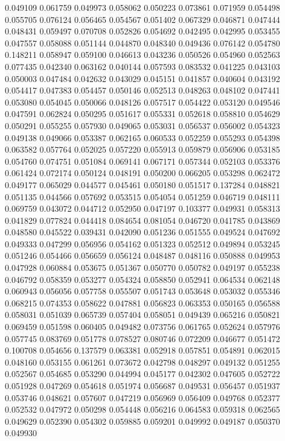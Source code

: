 0.049109
0.061759
0.049973
0.058062
0.050223
0.073861
0.071959
0.054498
0.055705
0.076124
0.056465
0.054567
0.051402
0.067329
0.046871
0.047444
0.048431
0.059497
0.070708
0.052826
0.054692
0.042495
0.042995
0.053455
0.047557
0.058088
0.051144
0.044870
0.048340
0.049436
0.076142
0.054780
0.148211
0.058947
0.059100
0.046613
0.043236
0.050526
0.054960
0.052563
0.077435
0.042340
0.063162
0.040144
0.057593
0.083532
0.041225
0.043103
0.050003
0.047484
0.042632
0.043029
0.045151
0.041857
0.040604
0.043192
0.054417
0.047383
0.054457
0.050146
0.052513
0.048263
0.048102
0.047441
0.053080
0.054045
0.050066
0.048126
0.057517
0.054422
0.053120
0.049546
0.047591
0.062824
0.050295
0.051617
0.055331
0.052618
0.058810
0.054629
0.050291
0.055255
0.057930
0.049065
0.053031
0.056537
0.056002
0.054323
0.049138
0.049066
0.053387
0.062165
0.060533
0.052259
0.055293
0.054398
0.063582
0.057764
0.052025
0.057220
0.055913
0.059879
0.056906
0.053185
0.054760
0.074751
0.051084
0.069141
0.067171
0.057344
0.052103
0.053376
0.061424
0.072174
0.050124
0.048191
0.050200
0.066205
0.053298
0.062472
0.049177
0.065029
0.044577
0.045461
0.050180
0.051517
0.137284
0.048821
0.051135
0.044566
0.057692
0.053515
0.054054
0.051259
0.046719
0.048111
0.069759
0.043072
0.044712
0.052950
0.047197
0.103377
0.049931
0.058313
0.041829
0.077824
0.044418
0.084654
0.081054
0.046720
0.041785
0.043869
0.048580
0.045522
0.039431
0.042090
0.051236
0.051555
0.049524
0.047692
0.049333
0.047299
0.056956
0.054162
0.051323
0.052512
0.049894
0.053245
0.051246
0.054466
0.056659
0.056124
0.048487
0.048116
0.050888
0.049953
0.047928
0.060884
0.053675
0.051367
0.050770
0.050782
0.049197
0.055238
0.046792
0.058359
0.053277
0.054324
0.058850
0.052941
0.064534
0.062148
0.060943
0.056056
0.057758
0.055507
0.051743
0.053648
0.053032
0.055346
0.068215
0.074353
0.058622
0.047881
0.056823
0.063353
0.050165
0.056588
0.058031
0.051039
0.065739
0.057404
0.058051
0.049439
0.065216
0.050821
0.069459
0.051598
0.060405
0.049482
0.073756
0.061765
0.052624
0.057976
0.057745
0.083769
0.051778
0.078527
0.080746
0.072209
0.046677
0.051472
0.100708
0.054656
0.137579
0.063381
0.052918
0.057851
0.054891
0.062015
0.048160
0.053155
0.061261
0.073672
0.042798
0.048297
0.049132
0.051255
0.052567
0.054685
0.053290
0.044994
0.045177
0.042302
0.047605
0.052722
0.051928
0.047269
0.054618
0.051974
0.056687
0.049531
0.056457
0.051937
0.053746
0.048621
0.057607
0.047219
0.056969
0.056409
0.049768
0.052377
0.052532
0.047972
0.050298
0.054448
0.056216
0.064583
0.059318
0.062565
0.049629
0.052390
0.054302
0.059885
0.059201
0.049992
0.049187
0.050370
0.049930
